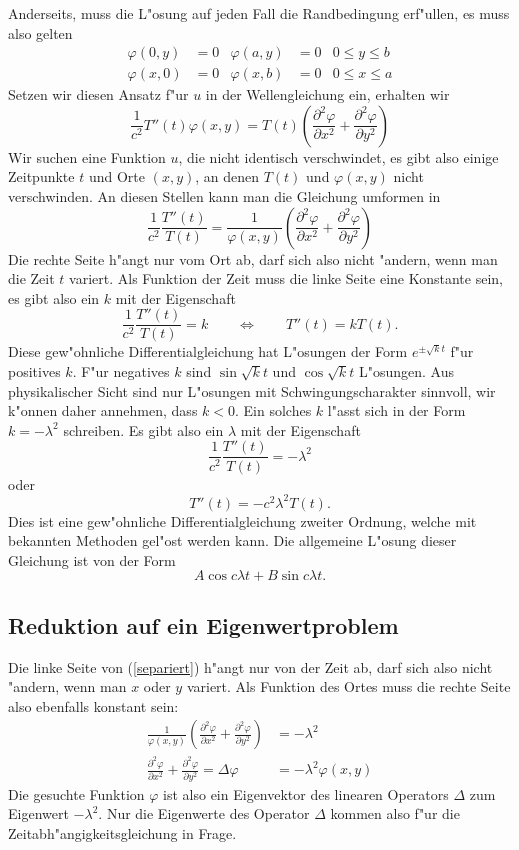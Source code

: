 Anderseits, muss die L"osung auf jeden Fall die Randbedingung erf"ullen,
es muss also gelten
\begin{align*}
\varphi(0,y)&=0&\varphi(a,y)&=0&0\le y\le b\\
\varphi(x,0)&=0&\varphi(x,b)&=0&0\le x\le a
\end{align*}
Setzen wir diesen Ansatz f"ur $u$ in der Wellengleichung ein,
erhalten wir
\[
\frac1{c^2}T''(t)\varphi(x,y)=T(t)\left(
\frac{\partial^2\varphi}{\partial x^2}
+
\frac{\partial^2\varphi}{\partial y^2}
\right)
\]
Wir suchen eine Funktion $u$, die nicht identisch verschwindet,
es gibt also einige Zeitpunkte $t$ und Orte $(x,y)$, an denen $T(t)$
und $\varphi(x,y)$ nicht verschwinden. An diesen Stellen kann man die
Gleichung umformen in
\begin{equation}
\frac1{c^2}\frac{T''(t)}{T(t)}
= \frac1{\varphi(x,y)}\left( \frac{\partial^2\varphi}{\partial x^2}
+ \frac{\partial^2\varphi}{\partial y^2} \right)
\label{separiert}
\end{equation}
Die rechte Seite h"angt nur
vom Ort ab, darf sich also nicht "andern, wenn man die Zeit $t$ variert.
Als Funktion der Zeit muss die linke Seite eine Konstante sein,
es gibt also ein $k$ mit der Eigenschaft
\[
\frac1{c^2}\frac{T''(t)}{T(t)}=k
\qquad\Leftrightarrow\qquad
T''(t)=k T(t).
\]
Diese gew"ohnliche Differentialgleichung hat L"osungen der Form 
$e^{\pm\sqrt{k}t}$ f"ur positives $k$. F"ur negatives $k$ sind $\sin\sqrt{k}t$ 
und $\cos\sqrt{k}t$ L"osungen.
Aus physikalischer Sicht sind nur L"osungen mit Schwingungscharakter sinnvoll,
wir k"onnen daher annehmen, dass $k<0$.
Ein solches $k$ l"asst sich in der Form $k=-\lambda^2$ schreiben.
Es gibt also ein $\lambda$ mit der Eigenschaft
\[
\frac1{c^2}\frac{T''(t)}{T(t)}=-\lambda^2
\]
oder
\[
T''(t)=-c^2\lambda^2 T(t).
\]
Dies ist eine gew"ohnliche Differentialgleichung zweiter Ordnung, welche mit
bekannten Methoden gel"ost werden kann.
Die allgemeine L"osung dieser Gleichung ist von der Form
\[
A\cos c\lambda t+B\sin c\lambda t.
\]

\subsection{Reduktion auf ein Eigenwertproblem}
Die linke Seite von (\ref{separiert}) h"angt nur von der Zeit ab, darf sich
also nicht "andern, wenn man $x$ oder $y$ variert. Als Funktion des Ortes
muss die rechte Seite also ebenfalls konstant sein:
\begin{align*}
\frac1{\varphi(x,y)}\left(
\frac{\partial^2\varphi}{\partial x^2}
+
\frac{\partial^2\varphi}{\partial y^2}
\right)&=-\lambda^2\\
\frac{\partial^2\varphi}{\partial x^2}
+
\frac{\partial^2\varphi}{\partial y^2}
=\Delta\varphi
&=-\lambda^2
\varphi(x,y)
\end{align*}
Die gesuchte Funktion $\varphi$ ist also ein Eigenvektor des linearen
Operators $\Delta$ zum Eigenwert $-\lambda^2$.
Nur die Eigenwerte des Operator $\Delta$ kommen also f"ur die
Zeitabh"angigkeitsgleichung in Frage.

